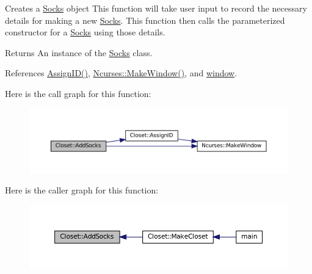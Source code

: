 Creates a \textquotesingle{}\mbox{\hyperlink{classSocks}{Socks}}\textquotesingle{} object This function will take user input to record the necessary details for making a new \textquotesingle{}\mbox{\hyperlink{classSocks}{Socks}}\textquotesingle{}. This function then calls the parameterized constructor for a \textquotesingle{}\mbox{\hyperlink{classSocks}{Socks}}\textquotesingle{} using those details. 

\begin{DoxyReturn}{Returns}
An instance of the \textquotesingle{}\mbox{\hyperlink{classSocks}{Socks}}\textquotesingle{} class. 
\end{DoxyReturn}


References \mbox{\hyperlink{classCloset_afabc27d621abdf0089a6b3027ea8f470}{Assign\+I\+D()}}, \mbox{\hyperlink{classNcurses_a1d8def11419a444c5696b5043da680d4}{Ncurses\+::\+Make\+Window()}}, and \mbox{\hyperlink{classCloset_af1eb4f786cc4eccd3018b90632236a93}{window}}.

Here is the call graph for this function\+:\nopagebreak
\begin{figure}[H]
\begin{center}
\leavevmode
\includegraphics[width=350pt]{classCloset_aac44ecf78525b3e0ac4ed80af2133186_cgraph}
\end{center}
\end{figure}
Here is the caller graph for this function\+:\nopagebreak
\begin{figure}[H]
\begin{center}
\leavevmode
\includegraphics[width=350pt]{classCloset_aac44ecf78525b3e0ac4ed80af2133186_icgraph}
\end{center}
\end{figure}
\mbox{\label{classCloset_afabc27d621abdf0089a6b3027ea8f470}} 
